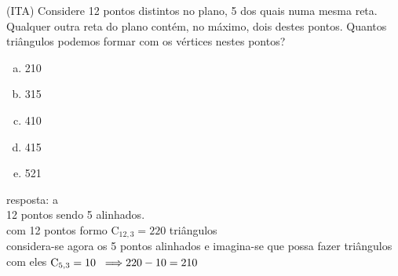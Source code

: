 \begin{ex}
 (ITA) Considere 12 pontos distintos no plano, 5 dos quais numa mesma reta. Qualquer outra reta do plano contém, no máximo, dois destes pontos. Quantos triângulos podemos formar com os vértices nestes pontos?
    \begin{enumerate}[(a)]
    \item 210
    \item 315
    \item 410
    \item 415
    \item 521
    \end{enumerate}
      \begin{sol}
       resposta: a \\
       12 pontos sendo 5 alinhados.\\
       com 12 pontos formo $\mathrm{C}_{{12},3} =  220$ triângulos \\
       considera-se agora os 5 pontos alinhados e imagina-se que possa fazer triângulos com eles  $\mathrm{C_{5,3}}=10 \hspace{0,2cm} \Longrightarrow 220-10=210$ 
       
      \end{sol}
\end{ex}